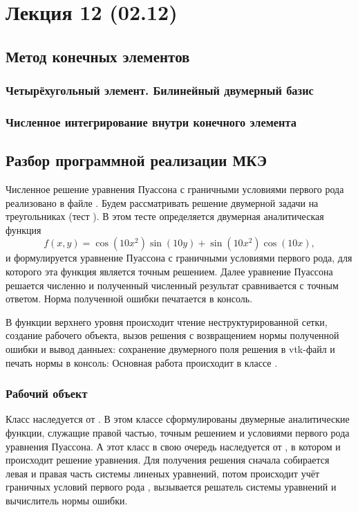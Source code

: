 \section{Лекция 12 (02.12)}
\subsection{Метод конечных элементов}
\subsubsection{Четырёхугольный элемент. Билинейный двумерный базис}
\subsubsection{Численное интегрирование внутри конечного элемента}
\subsection{Разбор программной реализации МКЭ}
Численное решение уравнения Пуассона с граничными
условиями первого рода реализовано в файле
.
Будем рассматривать решение двумерной задачи на треугольниках (тест ).
В этом тесте определяется двумерная аналитическая функция
$$
f(x, y) = \cos(10 x^2) \sin(10 y) + \sin(10 x^2) \cos(10 x),
$$
и формулируется уравнение Пуассона с граничными условиями первого рода, для которого эта функция является точным решением.
Далее уравнение Пуассона решается численно и полученный численный результат сравнивается
с точным ответом. Норма полученной ошибки печатается в консоль.

В функции верхнего уровня происходит чтение неструктурированной
сетки, создание рабочего объекта, вызов решения с возвращением нормы полученной ошибки
и вывод данныех: сохранение двумерного поля решения в vtk-файл и печать нормы в консоль:
Основная работа происходит в классе .

\subsubsection{Рабочий объект}
Класс 
наследуется от . В этом классе
сформулированы двумерные аналитические функции, служащие
правой частью, точным решением и условиями первого рода уравнения Пуассона.
А этот класс в свою очередь наследуется от ,
в котором и происходит решение уравнения.
Для получения решения сначала собирается левая и правая
часть системы линеных уравнений,
потом происходит учёт граничных условий первого рода
, вызывается решатель системы уравнений и вычислитель нормы ошибки.

